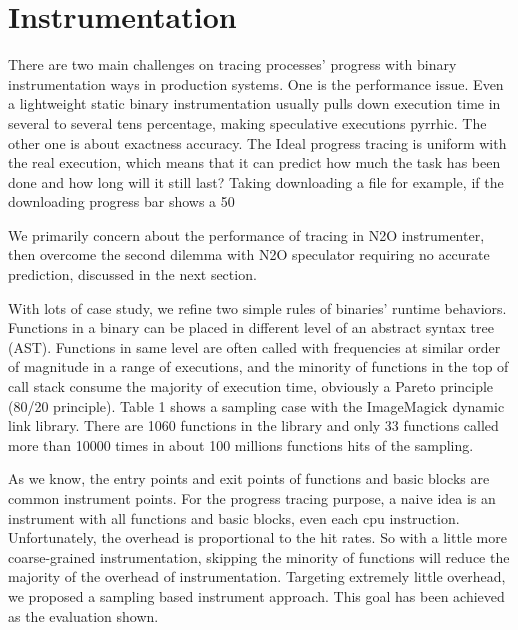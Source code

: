 \section{Instrumentation}

There are two main challenges on tracing processes’ progress with binary instrumentation ways in production systems. One is the performance issue. Even a lightweight static binary instrumentation usually pulls down execution time in several to several tens percentage, making speculative executions pyrrhic.  The other one is about exactness accuracy. The Ideal progress tracing is uniform with the real execution, which means that it can predict how much the task has been done and how long will it still last? Taking downloading a file for example, if the downloading progress bar shows a 50%

We primarily concern about the performance of tracing in N2O instrumenter, then overcome the second dilemma with N2O speculator requiring no accurate prediction, discussed in the next section.

With lots of case study, we refine two simple rules of binaries’ runtime behaviors. Functions in a binary can be placed in different level of an abstract syntax tree (AST). Functions in same level are often called with frequencies at similar order of magnitude in a range of executions, and the minority of functions in the top of call stack consume the majority of execution time, obviously a Pareto principle (80/20 principle). Table 1 shows a sampling case with the ImageMagick dynamic link library. There are 1060 functions in the library and only 33 functions called more than 10000 times in about 100 millions functions hits of the sampling.



As we know, the entry points and exit points of functions and basic blocks are common instrument points. For the progress tracing purpose, a naive idea is an instrument with all functions and basic blocks, even each cpu instruction. Unfortunately, the overhead is proportional to the hit rates. So with a little more coarse-grained instrumentation, skipping the minority of functions will reduce the majority of the overhead of instrumentation. Targeting extremely little overhead, we proposed a sampling based instrument approach. This goal has been achieved as the evaluation shown.

